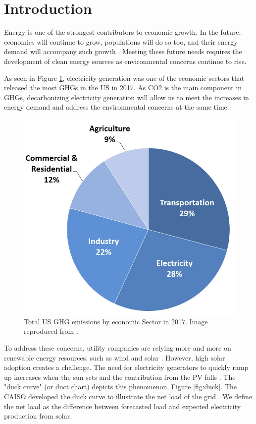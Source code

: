 \documentclass[11pt,letterpaper]{article}
\begin{document}
\section{Introduction}

Energy is one of the strongest contributors to economic growth.
In the future, economies will continue to grow, populations will do so too, and their energy demand will accompany such growth \cite{burke_impact_2018} \cite{el-shafie_hydrogen_2019}.
Meeting these future needs requires the development of clean energy sources as environmental concerns continue to rise.

As seen in Figure \ref{fig:ghg}, electricity generation was one of the economic sectors that released the most \glspl{GHG} in the \gls{US} in 2017.
As \gls{CO2} is the main component in \glspl{GHG}, decarbonizing electricity generation will allow us to meet the increases in energy demand and address the environmental concerns at the same time.

\begin{figure}[htbp!]
	\centering
	\includegraphics[width=0.5\linewidth]{figures/total-ghg-2017.png}
	\hfill
	\caption{Total \gls{US} \gls{GHG} emissions by economic Sector in 2017. Image reproduced from \cite{us_epa_sources_2020}.}
	\label{fig:ghg}
\end{figure}

To address these concerns, utility companies are relying more and more on renewable energy resources, such as wind and solar \cite{ming_resource_2019}.
However, high solar adoption creates a challenge.
The need for electricity generators to quickly ramp up increases when the sun sets and the contribution from the \gls{PV} falls \cite{us_department_of_energy_confronting_2017}.
The "duck curve" (or duct chart) depicts this phenomenon, Figure \ref{fig:duck}.
The \gls{CAISO} developed the duck curve to illustrate the net load of the grid \cite{bouillon_prepared_2014}.
We define the net load as the difference between forecasted load and expected electricity production from solar.
\end{document}
